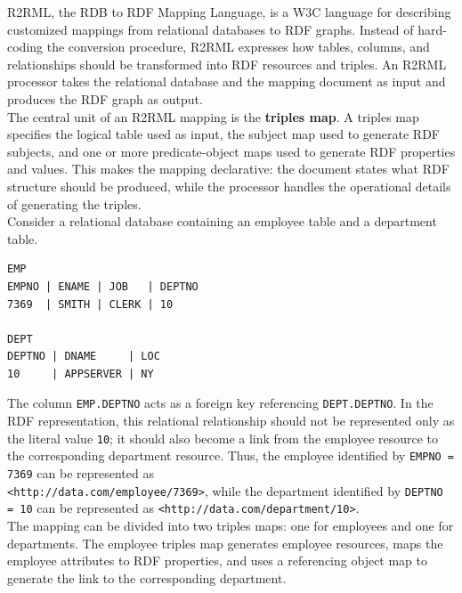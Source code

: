 \documentclass{scrbook}
\begin{document}
	R2RML, the RDB to RDF Mapping Language, is a W3C language for describing customized mappings from relational databases to RDF graphs. Instead of hard-coding the conversion procedure, R2RML expresses how tables, columns, and relationships should be transformed into RDF resources and triples. An R2RML processor takes the relational database and the mapping document as input and produces the RDF graph as output.\\
	
	The central unit of an R2RML mapping is the \textbf{triples map}. A triples map specifies the logical table used as input, the subject map used to generate RDF subjects, and one or more predicate-object maps used to generate RDF properties and values. This makes the mapping declarative: the document states what RDF structure should be produced, while the processor handles the operational details of generating the triples.\\
	
	Consider a relational database containing an employee table and a department table.
	
	\begin{lstlisting}
EMP
EMPNO | ENAME | JOB   | DEPTNO
7369  | SMITH | CLERK | 10

DEPT
DEPTNO | DNAME     | LOC
10     | APPSERVER | NY
	\end{lstlisting}
	
	The column \texttt{EMP.DEPTNO} acts as a foreign key referencing \texttt{DEPT.DEPTNO}. In the RDF representation, this relational relationship should not be represented only as the literal value \texttt{10}; it should also become a link from the employee resource to the corresponding department resource. Thus, the employee identified by \texttt{EMPNO = 7369} can be represented as\\
	\texttt{<http://data.com/employee/7369>}, while the department identified by \texttt{DEPTNO = 10} can be represented as \texttt{<http://data.com/department/10>}.\\
	
	The mapping can be divided into two triples maps: one for employees and one for departments. The employee triples map generates employee resources, maps the employee attributes to RDF properties, and uses a referencing object map to generate the link to the corresponding department.
	
\end{document}
